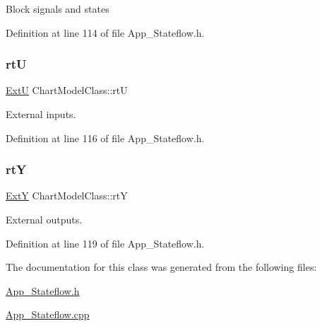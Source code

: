 Block signals and states 

Definition at line 114 of file App\+\_\+\+Stateflow.\+h.

\mbox{\label{class_chart_model_class_aa557038e416c73872f813e4206084532}} 
\subsubsection{\texorpdfstring{rtU}{rtU}}
{\footnotesize\ttfamily \mbox{\hyperlink{struct_ext_u}{ExtU}} Chart\+Model\+Class\+::rtU}



External inputs. 



Definition at line 116 of file App\+\_\+\+Stateflow.\+h.

\mbox{\label{class_chart_model_class_ac7425d26c91af4aaed697e7ac65b46fa}} 
\subsubsection{\texorpdfstring{rtY}{rtY}}
{\footnotesize\ttfamily \mbox{\hyperlink{struct_ext_y}{ExtY}} Chart\+Model\+Class\+::rtY}



External outputs. 



Definition at line 119 of file App\+\_\+\+Stateflow.\+h.



The documentation for this class was generated from the following files\+:\begin{DoxyCompactItemize}
\item 
\mbox{\hyperlink{_app___stateflow_8h}{App\+\_\+\+Stateflow.\+h}}\item 
\mbox{\hyperlink{_app___stateflow_8cpp}{App\+\_\+\+Stateflow.\+cpp}}\end{DoxyCompactItemize}
